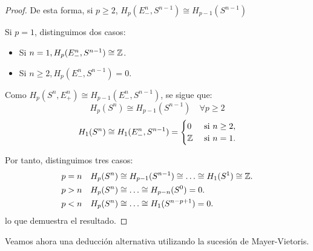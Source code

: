 \begin{proof}
  De esta forma, si $p \geq 2$, $H_p(E_-^n, S^{n-1}) \cong H_{p-1}(S^{n-1})$

  Si $p = 1$, distinguimos dos casos:

  \begin{itemize}
    \item Si $n = 1, H_p(E_-^n, S^{n-1}) \cong \mathbb{Z}$.
    \item Si $n \geq 2, H_p(E_-^n, S^{n-1}) = 0$.
  \end{itemize}

  Como $H_p(S^n, E_+^n) \cong H_{p-1}(E_-^n, S^{n-1})$, se sigue que:
  \[ H_p(S^n) \cong H_{p-1}(S^{n-1}) \quad \forall p \geq 2 \]
  \[ H_1(S^n) \cong H_1(E_-^n, S^{n-1}) = \begin{cases} 0 &\text{ si } n \geq 2, \\ \mathbb{Z} &\text{ si } n = 1. \end{cases} \]

  Por tanto, distinguimos tres casos:
  \begin{align*}
      p = n &\quad H_p(S^n) \cong H_{p-1}(S^{n-1}) \cong \dots \cong H_1(S^1) \cong \mathbb{Z}. \\
      p > n &\quad H_p(S^n) \cong \dots \cong H_{p-n}(S^0) = 0. \\
      p < n &\quad H_p(S^n) \cong \dots \cong H_1(S^{n-p+1}) = 0.
  \end{align*}
  lo que demuestra el resultado.
\end{proof}

Veamos ahora una deducción alternativa utilizando la sucesión de Mayer-Vietoris.

